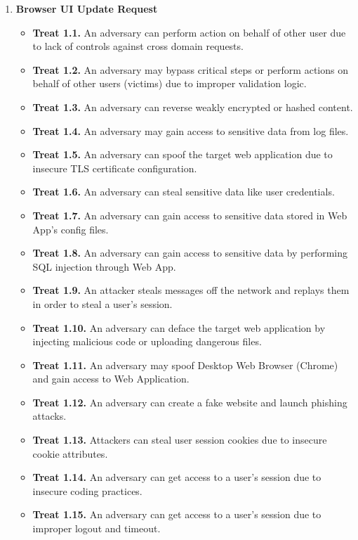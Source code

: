 \begin{enumerate}
    \item \textbf{Browser UI Update Request}
    \begin{itemize}
        \item \textbf{Treat 1.1.} An adversary can perform action on behalf of other user due to lack of controls against cross domain requests.
        \item \textbf{Treat 1.2.} An adversary may bypass critical steps or perform actions on behalf of other users (victims) due to improper validation logic.
        \item \textbf{Treat 1.3.} An adversary can reverse weakly encrypted or hashed content.
        \item \textbf{Treat 1.4.} An adversary may gain access to sensitive data from log files.
        \item \textbf{Treat 1.5.} An adversary can spoof the target web application due to insecure TLS certificate configuration.
        \item \textbf{Treat 1.6.} An adversary can steal sensitive data like user credentials.
        \item \textbf{Treat 1.7.} An adversary can gain access to sensitive data stored in Web App's config files.
        \item \textbf{Treat 1.8.} An adversary can gain access to sensitive data by performing SQL injection through Web App.
        \item \textbf{Treat 1.9.} An attacker steals messages off the network and replays them in order to steal a user's session.
        \item \textbf{Treat 1.10.} An adversary can deface the target web application by injecting malicious code or uploading dangerous files.
        \item \textbf{Treat 1.11.} An adversary may spoof Desktop Web Browser (Chrome) and gain access to Web Application.
        \item \textbf{Treat 1.12.} An adversary can create a fake website and launch phishing attacks.
        \item \textbf{Treat 1.13.} Attackers can steal user session cookies due to insecure cookie attributes.
        \item \textbf{Treat 1.14.} An adversary can get access to a user's session due to insecure coding practices.
        \item \textbf{Treat 1.15.} An adversary can get access to a user's session due to improper logout and timeout.

\end{itemize}
\end{enumerate}
